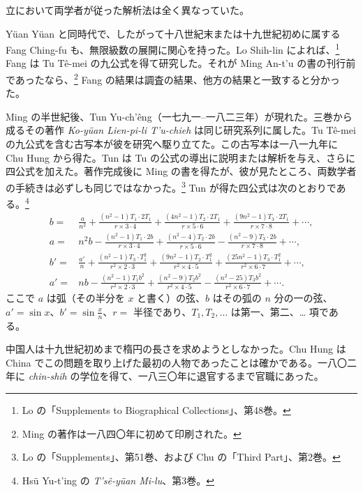 \documentclass[11pt]{article}
\newcommand{\scanpage}[2]{\clearpage\setcounter{footnote}{0}\noindent{\footnotesize\color{gray}PDF #1 頁 · #2}\par\medskip}
\newcommand{\scanfooter}{}
\begin{document}
\scanpage{0164}{第21章、印刷頁150}
立において両学者が従った解析法は全く異なっていた。

Yüan Yüan と同時代で、したがって十八世紀末または十九世紀初めに属する Fang Ching-fu も、無限級数の展開に関心を持った。Lo Shih-lin によれば、\footnote{Lo の「Supplements to Biographical Collections」、第48巻。} Fang は Tu Tê-mei の九公式を得て研究した。それが Ming An-t'u の書の刊行前であったなら、\footnote{Ming の著作は一八四〇年に初めて印刷された。} Fang の結果は調査の結果、他方の結果と一致すると分かった。

Ming の半世紀後、Tun Yu-ch'êng（一七九一--一八二三年）が現れた。三巻から成るその著作 \emph{Ko-yüan Lien-pi-li T'u-chieh} は同じ研究系列に属した。Tu Tê-mei の九公式を含む古写本が彼を研究へ駆り立てた。この古写本は一八一九年に Chu Hung から得た。Tun は Tu の公式の導出に説明または解析を与え、さらに四公式を加えた。著作完成後に Ming の書を得たが、彼が見たところ、両数学者の手続きは必ずしも同じではなかった。\footnote{Lo の「Supplements」、第51巻、および Chu の「Third Part」、第2巻。} Tun が得た四公式は次のとおりである。\footnote{Hsü Yu-t'ing の \emph{T'sê-yüan Mi-lu}、第3巻。}
\[
\begin{aligned}
b={}&\frac{a}{n^2}+\frac{(n^2-1)T_1\cdot2T_1}{r\times3\cdot4}
+\frac{(4n^2-1)T_2\cdot2T_1}{r\times5\cdot6}
+\frac{(9n^2-1)T_3\cdot2T_1}{r\times7\cdot8}+\cdots,\\
a={}&n^2b-\frac{(n^2-1)T_1\cdot2b}{r\times3\cdot4}
+\frac{(n^2-4)T_2\cdot2b}{r\times5\cdot6}
-\frac{(n^2-9)T_3\cdot2b}{r\times7\cdot8}+\cdots,\\
b'={}&\frac{a'}n+\frac{(n^2-1)T_3\cdot T_1^2}{r^2\times2\cdot3}
+\frac{(9n^2-1)T_2\cdot T_1^2}{r^2\times4\cdot5}
+\frac{(25n^2-1)T_3\cdot T_1^2}{r^2\times6\cdot7}+\cdots,\\
a'={}&nb-\frac{(n^2-1)T_1b^2}{r^2\times2\cdot3}
+\frac{(n^2-9)T_2b^2}{r^2\times4\cdot5}
-\frac{(n^2-25)T_3b^2}{r^2\times6\cdot7}+\cdots.
\end{aligned}
\]
ここで $a$ は弧（その半分を $x$ と書く）の弦、$b$ はその弧の $n$ 分の一の弦、$a'=\sin x$、$b'=\sin\frac{x}{n}$、$r=$ 半径であり、$T_1,T_2,\ldots$ は第一、第二、\ldots{} 項である。

中国人は十九世紀初めまで楕円の長さを求めようとしなかった。Chu Hung は China でこの問題を取り上げた最初の人物であったことは確かである。一八〇二年に \emph{chin-shih} の学位を得て、一八三〇年に退官するまで官職にあった。
\scanfooter
\end{document}
